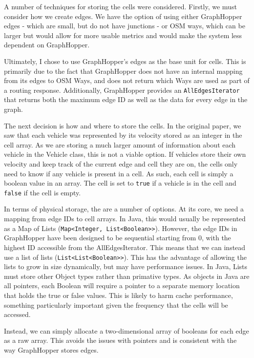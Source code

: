 \documentclass[ %
                    author={Alexander Hill},
                supervisor={Dr. Benjamin Sach},
                    degree={MEng},
                     title={MARMOSET: Multi Agent Real-time Multi-core Online
                     Simulation for Efficient Transportation},
                  subtitle={},
                      type={research},
                      year={2016} ]{dissertation}
\begin{document}
A number of techniques for storing the cells were considered. Firstly, we must
consider how we create edges. We have the option of using either GraphHopper
edges - which are small, but do not have junctions - or OSM ways, which can be
larger but would allow for more usable metrics and would make the system less
dependent on GraphHopper.

Ultimately, I chose to use GraphHopper's edges as the base unit for cells. This
is primarily due to the fact that GraphHopper does not have an internal mapping
from its edges to OSM Ways, and does not return which Ways are used as part of a
routing response. Additionally, GraphHopper provides an
\texttt{AllEdgesIterator} that returns both the maximum edge ID as well as the
data for every edge in the graph.

The next decision is how and where to store the cells. In the original paper,
we saw that each vehicle was represented by its velocity stored as an integer in
the cell array. As we are storing a much larger amount of information about each
vehicle in the Vehicle class, this is not a viable option. If vehicles store
their own velocity and keep track of the current edge and cell they are on, the
cells only need to know if any vehicle is present in a cell. As such, each cell
is simply a boolean value in an array. The cell is set to \texttt{true} if a
vehicle is in the cell and \texttt{false} if the cell is empty.

In terms of physical storage, the are a number of options. At its core, we need
a mapping from edge IDs to cell arrays. In Java, this would usually be
represented as a Map of Lists (\texttt{Map<Integer, List<Boolean>>}). However,
the edge IDs in GraphHopper have been designed to be sequential starting from 0,
with the highest ID accessible from the AllEdgesIterator. This means that we can
instead use a list of lists (\texttt{List<List<Boolean>>}). This has the
advantage of allowing the lists to grow in size dynamically, but may have
performance issues. In Java, Lists must store other Object types rather than
primative types. As objects in Java are all pointers, each Boolean will require
a pointer to a separate memory location that holds the true or false values.
This is likely to harm cache performance, something particularly important given
the frequency that the cells will be accessed.

Instead, we can simply allocate a two-dimensional array of booleans for each
edge as a raw array. This avoids the issues with pointers and is consistent with
the way GraphHopper stores edges.
\end{document}
